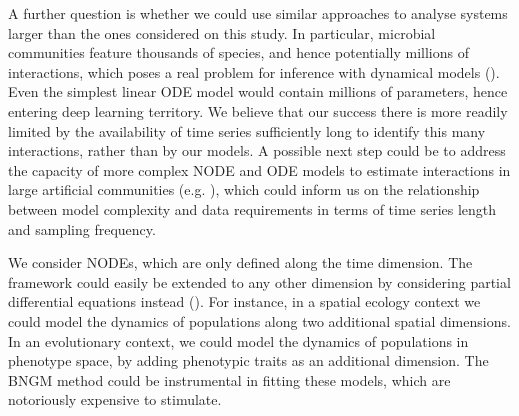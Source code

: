 \documentclass[11pt, oneside]{article}
\begin{document}

A further question is whether we could use similar approaches to analyse systems larger than the ones considered on this study.
In particular, microbial communities feature thousands of species, and hence potentially millions of interactions, which poses a real problem for inference with dynamical models (\cite{Ridenhour2017}).
Even the simplest linear ODE model would contain millions of parameters, hence entering deep learning territory.
We believe that our success there is more readily limited by the availability of time series sufficiently long to identify this many interactions, rather than by our models.
A possible next step could be to address the capacity of more complex NODE and ODE models to estimate interactions in large artificial communities (e.g. \cite{Coenen2020}), which could inform us on the relationship between model complexity and data requirements in terms of time series length and sampling frequency.

We consider NODEs, which are only defined along the time dimension.
The framework could easily be extended to any other dimension by considering partial differential equations instead (\cite{Rackauckas2019}).
For instance, in a spatial ecology context we could model the dynamics of populations along two additional spatial dimensions.
In an evolutionary context, we could model the dynamics of populations in phenotype space, by adding phenotypic traits as an additional dimension.
The BNGM method could be instrumental in fitting these models, which are notoriously expensive to stimulate.
\end{document}
